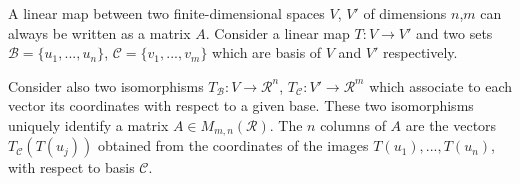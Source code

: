 
A linear map between two finite-dimensional spaces $V$, $V'$ of dimensions $n$,$m$
can always be written as a matrix $A$. Consider a linear map
$T: V \rightarrow V'$ and two sets $\mathcal{B}=\{u_{1},...,u_{n}\}$, $\mathcal{C}
=\{v_{1},...,v_{m}\}$ which are basis of $V$ and $V'$ respectively.

Consider also two isomorphisms $T_{\mathcal{B}}: V \rightarrow{\mathcal{R}}^{n}$,
$T_{\mathcal{C}}: V' \rightarrow{\mathcal{R}}^{m}$ which associate to each
vector its coordinates with respect to a given base. These two isomorphisms uniquely
identify a matrix $A \in M_{m,n}(\mathcal{R})$. The $n$ columns of $A$ are the
vectors $T_{\mathcal{C}}(T(u_{j}))$ obtained from the coordinates of the images
$T(u_{1}),...,T(u_{n})$, with respect to basis $\mathcal{C}$.

